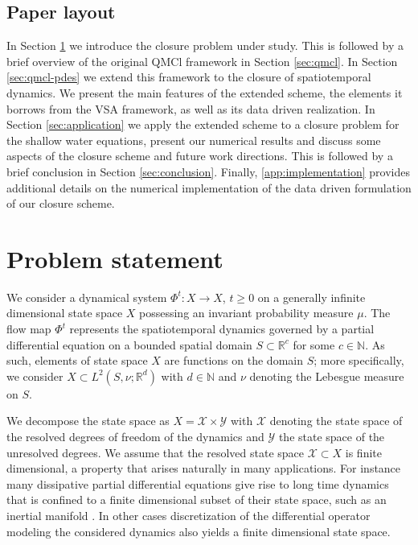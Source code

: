 \documentclass[letterpaper,10pt,3p,preprint]{elsarticle}
\newcommand{\Nbb}{\mathbb{N}}
\newcommand{\Rbb}{\mathbb{R}}
\newcommand{\Xcal}{\mathcal{X}}
\newcommand{\Ycal}{\mathcal{Y}}
\begin{document}
\subsection{Paper layout}\label{sec:layout}
In Section \ref{sec:problem-statement}
we introduce the closure problem under study.
This is followed by a brief overview of the
original QMCl framework in Section \ref{sec:qmcl}.
In Section \ref{sec:qmcl-pdes} we extend this framework to
the closure of spatiotemporal dynamics.
We present the main features of the extended scheme,
the elements it borrows from the VSA framework,
as well as its data driven realization.
In Section \ref{sec:application} we apply the
extended scheme to a closure problem for the shallow
water equations, present our numerical results
and discuss some aspects of the closure scheme
and future work directions.
This is followed by a brief conclusion in
Section \ref{sec:conclusion}.
Finally, \ref{app:implementation}
provides additional details on the numerical implementation
of the data driven formulation of our closure scheme.

\section{Problem statement}\label{sec:problem-statement}
We consider a dynamical system $\Phi^t\colon X\rightarrow X$,
$t\geq 0$ on a generally infinite dimensional state space $X$
possessing an invariant probability measure $\mu$.
The flow map $\Phi^t$ represents the spatiotemporal dynamics
governed by a partial differential equation on a bounded spatial
domain $S\subset\Rbb^c$ for some $c\in\Nbb$.
As such, elements of state space $X$ are functions on the
domain $S$; more specifically, we consider
$X\subset L^2(S,\nu;\Rbb^d)$ with $d\in\Nbb$ and
$\nu$ denoting the Lebesgue measure on $S$.

We decompose the state space as
$X=\Xcal\times\Ycal$
with $\Xcal$ denoting the state space of the resolved degrees
of freedom of the dynamics
and $\Ycal$ the state space of the unresolved degrees.
We assume that the resolved state space $\Xcal\subset X$
is finite dimensional, a property that arises naturally
in many applications.
For instance many dissipative partial differential equations
give rise to long time dynamics that is confined to a finite
dimensional subset of their state space,
such as an inertial manifold
\cite{Constantin1989,Temam1997}.
In other cases discretization of the differential
operator modeling the considered dynamics also yields a finite
dimensional state space.
\end{document}
